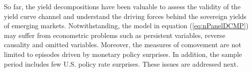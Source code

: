 {So far, the yield decompositions have been valuable to assess the validity of the yield curve channel and understand the driving forces behind the sovereign yields of emerging markets.
Notwithstanding, 
the model in equation (\ref{eq:nPanelDCMP}) may suffer from econometric problems such as persistent variables, reverse causality and omitted variables.
Moreover, the measures of comovement are not limited to episodes driven by monetary policy surprises. %
In addition, the sample period includes few U.S. policy rate surprises. %
These issues are addressed next.


%



}
